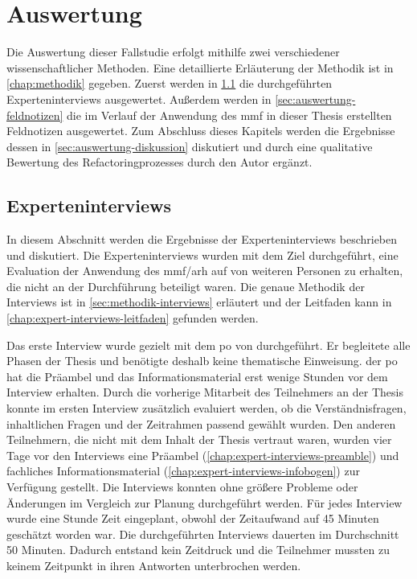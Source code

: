 \chapter{Auswertung}
\label{chap:auswertung}

Die Auswertung dieser Fallstudie erfolgt mithilfe zwei verschiedener wissenschaftlicher Methoden.
Eine detaillierte Erläuterung der Methodik ist in \cref{chap:methodik} gegeben.
Zuerst werden in \cref{sec:auswertung-interviews} die durchgeführten Experteninterviews ausgewertet.
Außerdem werden in \cref{sec:auswertung-feldnotizen} die im Ver\-lauf der Anwendung des \gls{mmf} in dieser Thesis erstellten Feldnotizen ausgewertet.
Zum Abschluss dieses Kapitels werden die Ergebnisse dessen in \cref{sec:auswertung-diskussion} diskutiert und durch eine qualitative Bewertung des Refactoringprozesses durch den Autor ergänzt.

\section{Experteninterviews}
\label{sec:auswertung-interviews}

In diesem Abschnitt werden die Ergebnisse der Experteninterviews beschrieben und diskutiert.
Die Ex\-per\-ten\-inter\-views wurden mit dem Ziel durchgeführt, eine Evaluation der Anwendung des \gls{mmf}/\gls{arh} auf \jf von weiteren Personen zu erhalten, die nicht an der Durchführung beteiligt waren.
Die genaue Methodik der Interviews ist in \cref{sec:methodik-interviews} erläutert und der Leitfaden kann in \cref{chap:expert-interviews-leitfaden} gefunden werden.

Das erste Interview wurde gezielt mit dem \gls{po} von \jf durchgeführt.
Er begleitete alle Phasen der Thesis und benötigte deshalb keine thematische Einweisung.
der \gls{po} hat die Präambel und das Informationsmaterial erst wenige Stunden vor dem Interview erhalten.
Durch die vorherige Mitarbeit des Teilnehmers an der Thesis konnte im ersten Interview zusätzlich evaluiert werden, ob die Verständnisfragen, inhaltlichen Fragen und der Zeitrahmen passend gewählt wurden.
Den anderen Teilnehmern, die nicht mit dem Inhalt der Thesis vertraut waren, wurden vier Tage vor den Interviews eine Präambel (\cref{chap:expert-interviews-preamble}) und fachliches Informationsmaterial (\cref{chap:expert-interviews-infobogen}) zur Verfügung gestellt.
Die Interviews konnten ohne größere Probleme oder Änderungen im Vergleich zur Planung durchgeführt werden.
Für jedes Interview wurde eine Stunde Zeit eingeplant, obwohl der Zeitaufwand auf 45 Minuten geschätzt worden war.
Die durchgeführten Interviews dauerten im Durchschnitt 50 Minuten.
Dadurch entstand kein Zeitdruck und die Teilnehmer mussten zu keinem Zeitpunkt in ihren Antworten unterbrochen werden.

